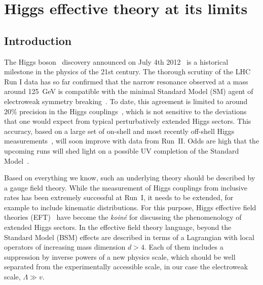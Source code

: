 

\chapter{Higgs effective theory at its limits}
\label{chapter:validity}



\section{Introduction}

The Higgs boson~\cite{Higgs:1964ia, Higgs:1964pj, Englert:1964et}
discovery announced on July 4th 2012~\cite{Aad:2012tfa,
  Chatrchyan:2012xdj} is a historical milestone in the physics of the
21st century.  The thorough scrutiny of the LHC Run I data has so far
confirmed that the narrow resonance observed at a mass around 125~GeV
is compatible with the minimal Standard Model (SM) agent of
electroweak symmetry breaking~\cite{Plehn:2009nd}. To date, this
agreement is limited to around $20\%$ precision in the Higgs
couplings~\cite{Lafaye:2009vr, Corbett:2012ja, Klute:2012pu,
  Dobrescu:2012td, Cheung:2013kla, Giardino:2013bma, Chang:2013cia,
  Djouadi:2013qya, Corbett:2015ksa}, which is not sensitive to the
deviations that one would expect from typical perturbatively extended
Higgs sectors.  This accuracy, based on a large set of on-shell and
most recently off-shell Higgs measurements~\cite{Corbett:2015ksa}, will
soon improve with data from Run~II.  Odds are high that the upcoming
runs will shed light on a possible UV completion of the Standard
Model~\cite{Englert:2014uua, Morrissey:2009tf}.

Based on everything we know, such an underlying theory should be
described by a gauge field theory. While the measurement of Higgs
couplings from inclusive rates has been extremely successful at Run~I,
it needs to be extended, for example to include kinematic
distributions. For this purpose, Higgs effective field theories
(EFT)~\cite{Weinberg:1980wa, Coleman:1969sm, Callan:1969sn,
  Burges:1983zg, Leung:1984ni, Buchmuller:1985jz} have become the
\emph{koin\'e} for discussing the phenomenology of extended Higgs
sectors.  In the effective field theory language, beyond the Standard
Model (BSM) effects are described in terms of a Lagrangian with local
operators of increasing mass dimension $d > 4$. Each of them includes
a suppression by inverse powers of a new physics scale, which should
be well separated from the experimentally accessible scale, in our
case the electroweak scale, $\Lambda \gg v$.

